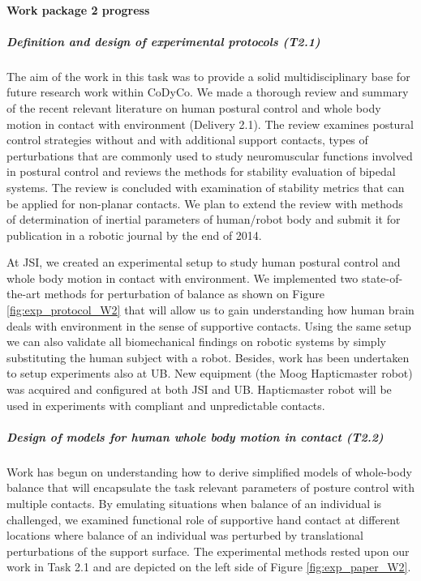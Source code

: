 \paragraph{Work package 2 progress}

\subparagraph{Definition and design of experimental protocols (T2.1)}

The aim of the work in this task was to provide a solid multidisciplinary base for future research work within CoDyCo. We made a thorough review and summary of the recent relevant literature on human postural control and whole body motion in contact with environment (Delivery 2.1). The review examines postural control strategies without and with additional support contacts, types of perturbations that are commonly used to study neuromuscular functions involved in postural control and reviews the methods for stability evaluation of bipedal systems. The review is concluded with examination of stability metrics that can be applied for non-planar contacts. We plan to extend the review with methods of determination of inertial parameters of human/robot body and submit it for publication in a robotic journal by the end of 2014.

At JSI, we created an experimental setup to study human postural control and whole body motion in contact with environment. We implemented two state-of-the-art methods for perturbation of balance as shown on Figure \ref{fig:exp_protocol_W2} that will allow us to gain understanding how human brain deals with environment in the sense of supportive contacts. Using the same setup we can also validate all biomechanical findings on robotic systems by simply substituting the human subject with a robot. Besides, work has been undertaken to setup experiments also at UB. New equipment (the Moog Hapticmaster robot) was acquired and configured at both JSI and UB. Hapticmaster robot will be used in experiments with compliant and unpredictable contacts.


\subparagraph{Design of models for human whole body motion in contact (T2.2)}

Work has begun on understanding how to derive simplified models of whole-body balance that will encapsulate the task relevant parameters of posture control with multiple contacts. By emulating situations when balance of an individual is challenged, we examined functional role of supportive hand contact at different locations where balance of an individual was perturbed by translational perturbations of the support surface. The experimental methods rested upon our work in Task 2.1 and are depicted on the left side of Figure \ref{fig:exp_paper_W2}.


